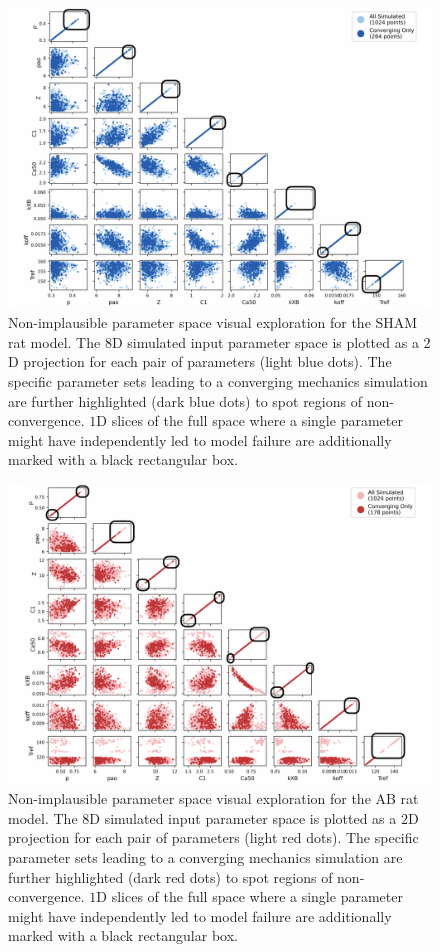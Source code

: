 \begin{figure}[ht!]
    \myfloatalign
    \includegraphics[width=\textwidth]{figures/chapter09/conv_vs_nonconv_sham.pdf}
    \caption{Non-implausible parameter space visual exploration for the SHAM rat model. The $8$D simulated input parameter space is plotted as a $2$D projection for each pair of parameters (light blue dots). The specific parameter sets leading to a converging mechanics simulation are further highlighted (dark blue dots) to spot regions of non-convergence. $1$D slices of the full space where a single parameter might have independently led to model failure are additionally marked with a black rectangular box.}
    \label{fig:shamnimpspaceexamined}
\end{figure}

\begin{figure}[ht!]
    \myfloatalign
    \includegraphics[width=\textwidth]{figures/chapter09/conv_vs_nonconv_ab.pdf}
    \caption{Non-implausible parameter space visual exploration for the AB rat model. The $8$D simulated input parameter space is plotted as a $2$D projection for each pair of parameters (light red dots). The specific parameter sets leading to a converging mechanics simulation are further highlighted (dark red dots) to spot regions of non-convergence. $1$D slices of the full space where a single parameter might have independently led to model failure are additionally marked with a black rectangular box.}
    \label{fig:abnimpspaceexamined}
\end{figure}

